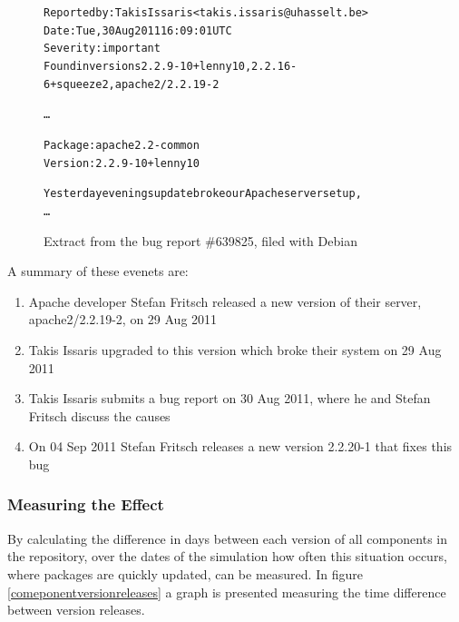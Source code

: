 \begin{figure}[htp]
\begin{center}
\begin{alltt}

Reported by: Takis Issaris <takis.issaris@uhasselt.be>
Date: Tue, 30 Aug 2011 16:09:01 UTC
Severity: important
Found in versions 2.2.9-10+lenny10, 2.2.16-6+squeeze2, apache2/2.2.19-2

\ldots

Package: apache2.2-common
Version: 2.2.9-10+lenny10

Yesterday evenings update broke our Apache server setup,
\ldots
\end{alltt}
\caption[Apache Bug Report]{Extract from the bug report \#639825, filed with Debian}
\label{apachebug}
\end{center}
\end{figure}

A summary of these evenets are:
\begin{enumerate}
  \item Apache developer Stefan Fritsch released a new version of their server, apache2/2.2.19-2, on 29 Aug 2011
  \item Takis Issaris upgraded to this version which broke their system on 29 Aug 2011
  \item Takis Issaris submits a bug report on 30 Aug 2011, where he and Stefan Fritsch discuss the causes
  \item On 04 Sep 2011 Stefan Fritsch releases a new version 2.2.20-1 that fixes this bug
\end{enumerate}



\subsubsection{Measuring the Effect}
By calculating the difference in days between each version of all components in the repository, 
over the dates of the simulation how often this situation occurs, where packages are quickly updated, can be measured.
In figure \ref{comeponentversionreleases} a graph is presented measuring the time difference between version releases.
 
